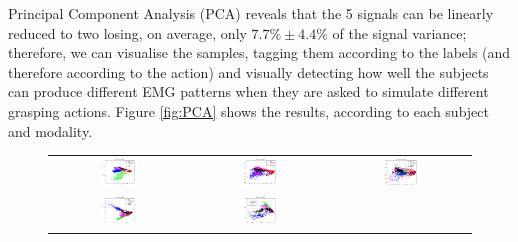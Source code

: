 Principal Component Analysis (PCA) reveals that the 5 signals can be
linearly reduced to two losing, on average, only $7.7\% \pm 4.4\%$ of
the signal variance; therefore, we can visualise the samples, tagging
them according to the labels (and therefore according to the action)
and visually detecting how well the subjects can produce different EMG
patterns when they are asked to simulate different grasping
actions. Figure \ref{fig:PCA} shows the results, according to each
subject and modality.

\begin{figure}[!ht] \centering
  \begin{tabular}{ccc}
    \includegraphics[width=0.3\textwidth]{figs/data11} &
    \includegraphics[width=0.3\textwidth]{figs/data12} &
    \includegraphics[width=0.3\textwidth]{figs/data13} \\
    \includegraphics[width=0.3\textwidth]{figs/data21} &
    \includegraphics[width=0.3\textwidth]{figs/data22} &

\end{tabular}
\end{figure}
